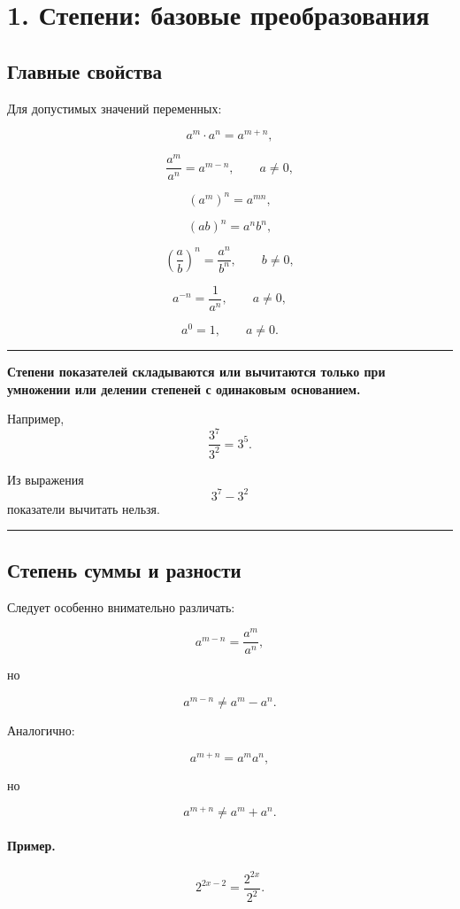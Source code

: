 \documentclass[a4paper,12pt]{article}
\newcommand{\important}[1]{\textbf{\color{darkaccent}#1}}
\newcommand{\keyidea}[1]{%
    \par\medskip
    {\color{accent}\rule{\linewidth}{0.6pt}}\par
    \smallskip
    #1
    \smallskip
    {\color{accent}\rule{\linewidth}{0.6pt}}\par
    \medskip
}
\begin{document}

\section{1. Степени: базовые преобразования}

\subsection{Главные свойства}

Для допустимых значений переменных:

\[
a^m\cdot a^n=a^{m+n},
\]

\[
\frac{a^m}{a^n}=a^{m-n},
\qquad a\ne0,
\]

\[
(a^m)^n=a^{mn},
\]

\[
(ab)^n=a^n b^n,
\]

\[
\left(\frac{a}{b}\right)^n
=
\frac{a^n}{b^n},
\qquad b\ne0,
\]

\[
a^{-n}=\frac{1}{a^n},
\qquad a\ne0,
\]

\[
a^0=1,
\qquad a\ne0.
\]

\keyidea{
\important{Степени показателей складываются или вычитаются только при умножении или делении степеней с одинаковым основанием.}

Например,
\[
\frac{3^7}{3^2}=3^5.
\]

Из выражения
\[
3^7-3^2
\]
показатели вычитать нельзя.
}

\subsection{Степень суммы и разности}

Следует особенно внимательно различать:

\[
a^{m-n}
=
\frac{a^m}{a^n},
\]

но

\[
a^{m-n}\ne a^m-a^n.
\]

Аналогично:

\[
a^{m+n}=a^m a^n,
\]

но

\[
a^{m+n}\ne a^m+a^n.
\]

\paragraph{Пример.}
\[
2^{2x-2}
=
\frac{2^{2x}}{2^2}.
\]
\end{document}
